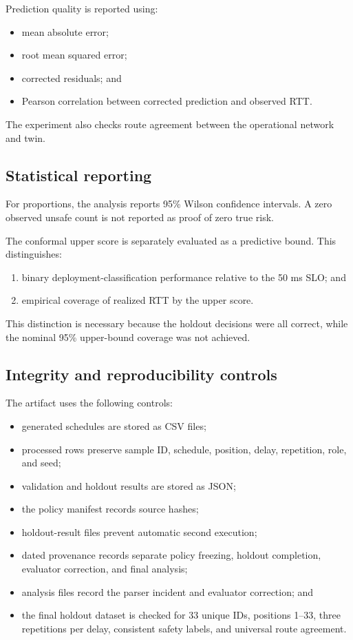 Prediction quality is reported using:
\begin{itemize}
\item mean absolute error;
\item root mean squared error;
\item corrected residuals; and
\item Pearson correlation between corrected prediction and observed RTT.
\end{itemize}
The experiment also checks route agreement between the operational network and twin.

\subsection{Statistical reporting}

For proportions, the analysis reports 95\% Wilson confidence intervals. A zero observed unsafe count is not reported as proof of zero true risk.

The conformal upper score is separately evaluated as a predictive bound. This distinguishes:
\begin{enumerate}
\item binary deployment-classification performance relative to the 50 ms SLO; and
\item empirical coverage of realized RTT by the upper score.
\end{enumerate}
This distinction is necessary because the holdout decisions were all correct, while the nominal 95\% upper-bound coverage was not achieved.

\subsection{Integrity and reproducibility controls}

The artifact uses the following controls:
\begin{itemize}
\item generated schedules are stored as CSV files;
\item processed rows preserve sample ID, schedule, position, delay, repetition, role, and seed;
\item validation and holdout results are stored as JSON;
\item the policy manifest records source hashes;
\item holdout-result files prevent automatic second execution;
\item dated provenance records separate policy freezing, holdout completion, evaluator correction, and final analysis;
\item analysis files record the parser incident and evaluator correction; and
\item the final holdout dataset is checked for 33 unique IDs, positions 1--33, three repetitions per delay, consistent safety labels, and universal route agreement.
\end{itemize}
